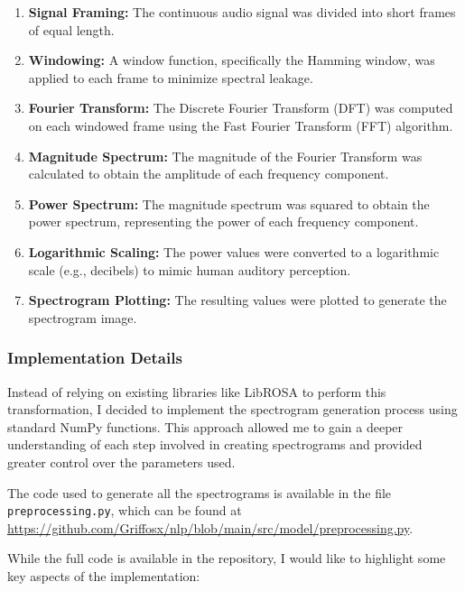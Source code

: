 \documentclass[12pt]{article}
\begin{document}
\begin{enumerate}
\item \textbf{Signal Framing:} The continuous audio signal was divided into short frames of equal length.
\item \textbf{Windowing:} A window function, specifically the Hamming window, was applied to each frame to minimize spectral leakage.
\item \textbf{Fourier Transform:} The Discrete Fourier Transform (DFT) was computed on each windowed frame using the Fast Fourier Transform (FFT) algorithm.
\item \textbf{Magnitude Spectrum:} The magnitude of the Fourier Transform was calculated to obtain the amplitude of each frequency component.
\item \textbf{Power Spectrum:} The magnitude spectrum was squared to obtain the power spectrum, representing the power of each frequency component.
\item \textbf{Logarithmic Scaling:} The power values were converted to a logarithmic scale (e.g., decibels) to mimic human auditory perception.
\item \textbf{Spectrogram Plotting:} The resulting values were plotted to generate the spectrogram image.
\end{enumerate}

\subsubsection{Implementation Details}

Instead of relying on existing libraries like LibROSA to perform this transformation, I decided to implement the spectrogram generation process using standard NumPy functions. This approach allowed me to gain a deeper understanding of each step involved in creating spectrograms and provided greater control over the parameters used.

The code used to generate all the spectrograms is available in the file \texttt{preprocessing.py}, which can be found at \href{https://github.com/Griffosx/nlp/blob/main/src/model/preprocessing.py}{https://github.com/Griffosx/nlp/blob/main/src/model/preprocessing.py}.

While the full code is available in the repository, I would like to highlight some key aspects of the implementation:
\end{document}
